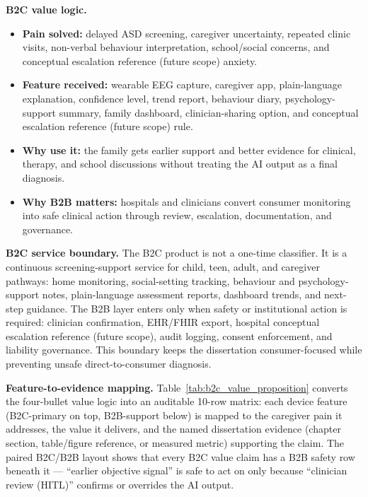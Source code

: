 \noindent\textbf{B2C value logic.}
\begin{itemize}[leftmargin=*, itemsep=2pt]
    \item \textbf{Pain solved:} delayed ASD screening, caregiver uncertainty, repeated clinic visits, non-verbal behaviour interpretation, school/social concerns, and conceptual escalation reference (future scope) anxiety.
    \item \textbf{Feature received:} wearable EEG capture, caregiver app, plain-language explanation, confidence level, trend report, behaviour diary, psychology-support summary, family dashboard, clinician-sharing option, and conceptual escalation reference (future scope) rule.
    \item \textbf{Why use it:} the family gets earlier support and better evidence for clinical, therapy, and school discussions without treating the AI output as a final diagnosis.
    \item \textbf{Why B2B matters:} hospitals and clinicians convert consumer monitoring into safe clinical action through review, escalation, documentation, and governance.
\end{itemize}

\noindent\textbf{B2C service boundary.} The B2C product is not a one-time classifier. It is a continuous screening-support service for child, teen, adult, and caregiver pathways: home monitoring, social-setting tracking, behaviour and psychology-support notes, plain-language assessment reports, dashboard trends, and next-step guidance. The B2B layer enters only when safety or institutional action is required: clinician confirmation, EHR/FHIR export, hospital conceptual escalation reference (future scope), audit logging, consent enforcement, and liability governance. This boundary keeps the dissertation consumer-focused while preventing unsafe direct-to-consumer diagnosis.

\noindent\textbf{Feature-to-evidence mapping.} Table~\ref{tab:b2c_value_proposition} converts the four-bullet value logic into an auditable 10-row matrix: each device feature (B2C-primary on top, B2B-support below) is mapped to the caregiver pain it addresses, the value it delivers, and the named dissertation evidence (chapter section, table/figure reference, or measured metric) supporting the claim. The paired B2C/B2B layout shows that every B2C value claim has a B2B safety row beneath it --- ``earlier objective signal'' is safe to act on only because ``clinician review (HITL)'' confirms or overrides the AI output.

